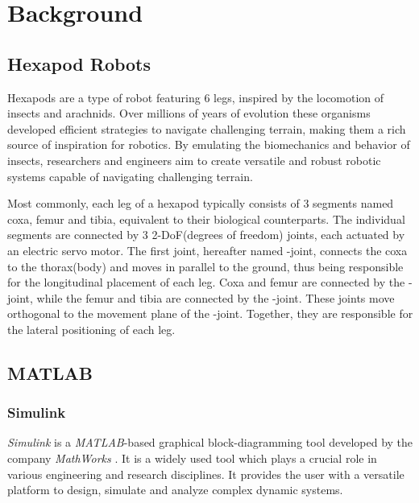\chapter{Background}
\label{ch:background}


\section{Hexapod Robots}
Hexapods are a type of robot featuring 6 legs, inspired by the locomotion of insects and arachnids.
Over millions of years of evolution these organisms developed efficient strategies to navigate challenging terrain, making them a rich source of inspiration for robotics.
By emulating the biomechanics and behavior of insects, researchers and engineers aim to create versatile and robust robotic systems capable of navigating challenging terrain.

Most commonly, each leg of a hexapod typically consists of 3 segments named coxa, femur and tibia, equivalent to their biological counterparts.
The individual segments are connected by 3 2-DoF(degrees of freedom) joints, each actuated by an electric servo motor.
The first joint, hereafter named \textalpha-joint, connects the coxa to the thorax(body) and moves in parallel to the ground, thus being responsible for the longitudinal placement of each leg.
Coxa and femur are connected by the \textbeta-joint, while the femur and tibia are connected by the \textgamma-joint. 
These joints move orthogonal to the movement plane of the \textalpha-joint. Together, they are responsible for the lateral positioning of each leg.





\section{MATLAB}
\subsection{Simulink}
\textit{Simulink\textsuperscript{\textregistered}} is a \textit{MATLAB\textsuperscript{\textregistered}}-based graphical block-diagramming tool developed by the company \textit{MathWorks\textsuperscript{\textregistered}} .
It is a widely used tool which plays a crucial role in various engineering and research disciplines.
It provides the user with a versatile platform to design, simulate and analyze complex dynamic systems.

